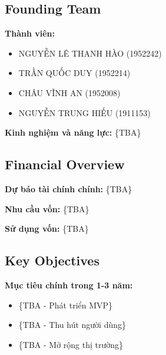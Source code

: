 \subsection{Founding Team}
\textbf{Thành viên:}
\begin{itemize}
    \item NGUYỄN LÊ THANH HÀO (1952242)
    \item TRẦN QUỐC DUY (1952214) 
    \item CHÂU VĨNH AN (1952008)
    \item NGUYỄN TRUNG HIẾU (1911153)
\end{itemize}

\textbf{Kinh nghiệm và năng lực:} \{TBA\}

\subsection{Financial Overview}
\textbf{Dự báo tài chính chính:} \{TBA\}

\textbf{Nhu cầu vốn:} \{TBA\}

\textbf{Sử dụng vốn:} \{TBA\}

\subsection{Key Objectives}
\textbf{Mục tiêu chính trong 1-3 năm:}
\begin{itemize}
    \item \{TBA - Phát triển MVP\}
    \item \{TBA - Thu hút người dùng\}
    \item \{TBA - Mở rộng thị trường\}
\end{itemize}